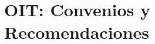 \documentclass[../main.tex]{subfiles}
\begin{document}
\chapter{OIT: Convenios y Recomendaciones}
\end{document}
